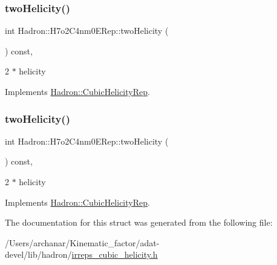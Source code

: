 \subsubsection{\texorpdfstring{twoHelicity()}{twoHelicity()}\hspace{0.1cm}{\footnotesize\ttfamily [2/3]}}
{\footnotesize\ttfamily int Hadron\+::\+H7o2\+C4nm0\+E\+Rep\+::two\+Helicity (\begin{DoxyParamCaption}{ }\end{DoxyParamCaption}) const\hspace{0.3cm}{\ttfamily [inline]}, {\ttfamily [virtual]}}

2 $\ast$ helicity 

Implements \mbox{\hyperlink{structHadron_1_1CubicHelicityRep_af507aa56fc2747eacc8cb6c96db31ecc}{Hadron\+::\+Cubic\+Helicity\+Rep}}.

\mbox{\label{structHadron_1_1H7o2C4nm0ERep_aa823f506650bea0e0e2f79894f6f8360}} 
\subsubsection{\texorpdfstring{twoHelicity()}{twoHelicity()}\hspace{0.1cm}{\footnotesize\ttfamily [3/3]}}
{\footnotesize\ttfamily int Hadron\+::\+H7o2\+C4nm0\+E\+Rep\+::two\+Helicity (\begin{DoxyParamCaption}{ }\end{DoxyParamCaption}) const\hspace{0.3cm}{\ttfamily [inline]}, {\ttfamily [virtual]}}

2 $\ast$ helicity 

Implements \mbox{\hyperlink{structHadron_1_1CubicHelicityRep_af507aa56fc2747eacc8cb6c96db31ecc}{Hadron\+::\+Cubic\+Helicity\+Rep}}.



The documentation for this struct was generated from the following file\+:\begin{DoxyCompactItemize}
\item 
/\+Users/archanar/\+Kinematic\+\_\+factor/adat-\/devel/lib/hadron/\mbox{\hyperlink{adat-devel_2lib_2hadron_2irreps__cubic__helicity_8h}{irreps\+\_\+cubic\+\_\+helicity.\+h}}\end{DoxyCompactItemize}
